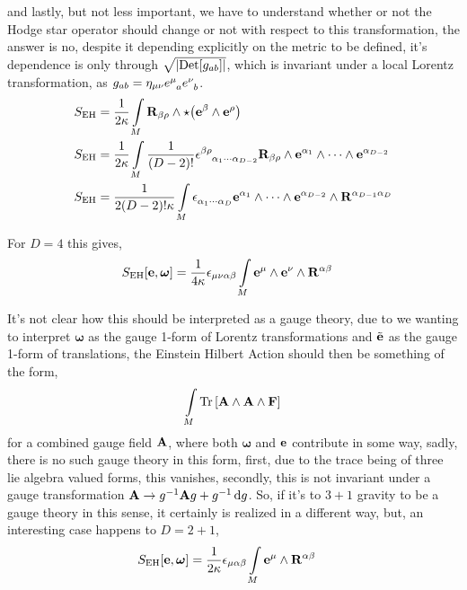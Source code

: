 and lastly, but not less important, we have to understand whether or not the Hodge star operator should change or not with respect to this transformation, the answer is no, despite it depending explicitly on the 
metric to be defined, it's dependence is only through $\sqrt{\abs{\textup{Det} \qty[g_{ab}]}}$, which is invariant under a local Lorentz transformation, as $g_{ab}=\eta_{\mu\nu}\tensor{e}{^\mu_a}\tensor{e}{^\nu_b}$.
\begin{align*}
    S_{\textnormal{EH}}&=\frac{1}{2\kappa}\int\limits_M\vb R_{\beta\rho}\wedge\star\qty(\vb e^{\beta}\wedge\vb e^{\rho})\\
    S_{\textnormal{EH}}&=\frac{1}{2\kappa}\int\limits_M\frac{1}{\qty(D-2)!}\tensor{\epsilon}{^\beta^\rho_{\alpha_1}_\cdots_{\alpha_{D-2}}}\vb R_{\beta\rho}\wedge\vb e^{\alpha_1}\wedge\cdots\wedge\vb e^{\alpha_{D-2}}\\
    S_{\textnormal{EH}}&=\frac{1}{2\qty(D-2)!\kappa}\int\limits_M\tensor{\epsilon}{_{\alpha_1}_\cdots_{\alpha_{D}}}\vb e^{\alpha_1}\wedge\cdots\wedge\vb e^{\alpha_{D-2}}\wedge\vb R^{\alpha_{D-1}\alpha_{D}}
\end{align*}

For $D=4$ this gives,
\begin{align*}
    S_{\textnormal{EH}}\qty[\vb e,\boldsymbol\omega]&=\frac{1}{4\kappa}\epsilon_{\mu\nu\alpha\beta}\int\limits_M\vb e^{\mu}\wedge\vb e^\nu\wedge\vb R^{\alpha\beta}
\end{align*}

It's not clear how this should be interpreted as a gauge theory, due to we wanting to interpret $\boldsymbol\omega$ as the gauge 1-form of Lorentz transformations and $\tilde{\vb e}$ as the gauge 1-form of 
translations, the Einstein Hilbert Action should then be something of the form,
\begin{align*}
    \int\limits_M\Tr\qty[\vb A\wedge\vb A\wedge\vb F]
\end{align*}
for a combined gauge field $\vb A$, where both $\boldsymbol\omega$ and $\vb e$ contribute in some way, sadly, there is no such gauge theory in this form, 
first, due to the trace being of three lie algebra valued forms, this vanishes, secondly, this is not invariant under a gauge transformation $\vb A\rightarrow g^{-1}\vb Ag+g^{-1}\dd{g}$. So, 
if it's to $3+1$ gravity to be a gauge theory in this sense, it certainly is realized in a different way, but, an interesting case happens to $D=2+1$,
\begin{align*}
    S_{\textnormal{EH}}\qty[\vb e,\boldsymbol\omega]&=\frac{1}{2\kappa}\epsilon_{\mu\alpha\beta}\int\limits_M\vb e^{\mu}\wedge\vb R^{\alpha\beta}
\end{align*}

